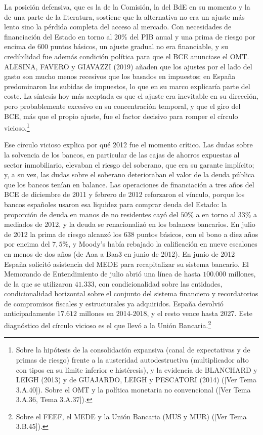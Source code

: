 \documentclass[10pt,a4paper]{article}
\newcommand{\authorfont}[1]{{\fontfamily{EBGaramond-TLF}\selectfont #1}}
\begin{document}
La posición defensiva, que es la de la Comisión, la del BdE en su momento y la de una parte de la literatura, sostiene que la alternativa no era un ajuste más lento sino la pérdida completa del acceso al mercado. Con necesidades de financiación del Estado en torno al $20\%$ del PIB anual y una prima de riesgo por encima de $600$ puntos básicos, un ajuste gradual no era financiable, y su credibilidad fue además condición política para que el BCE anunciase el OMT. ALESINA, FAVERO y GIAVAZZI (2019) añaden que los ajustes por el lado del gasto son mucho menos recesivos que los basados en impuestos; en España predominaron las subidas de impuestos, lo que en su marco explicaría parte del coste. La síntesis hoy más aceptada es que el ajuste era inevitable en su dirección, pero probablemente excesivo en su concentración temporal, y que el giro del BCE, más que el propio ajuste, fue el factor decisivo para romper el círculo vicioso.\footnote{Sobre la hipótesis de la consolidación expansiva (canal de expectativas y de primas de riesgo) frente a la austeridad autodestructiva (multiplicador alto con tipos en su límite inferior e histéresis), y la evidencia de BLANCHARD y LEIGH (2013) y de GUAJARDO, LEIGH y PESCATORI (2014) ([\authorfont{Ver Tema 3.A.40}]). Sobre el OMT y la política monetaria no convencional ([\authorfont{Ver Tema 3.A.36, Tema 3.A.37}]).
}

Ese círculo vicioso explica por qué 2012 fue el momento crítico. Las dudas sobre la solvencia de los bancos, en particular de las cajas de ahorros expuestas al sector inmobiliario, elevaban el riesgo del soberano, que era su garante implícito; y, a su vez, las dudas sobre el soberano deterioraban el valor de la deuda pública que los bancos tenían en balance. Las operaciones de financiación a tres años del BCE de diciembre de 2011 y febrero de 2012 reforzaron el vínculo, porque los bancos españoles usaron esa liquidez para comprar deuda del Estado: la proporción de deuda en manos de no residentes cayó del $50\%$ a en torno al $33\%$ a mediados de 2012, y la deuda se renacionalizó en los balances bancarios. En julio de 2012 la prima de riesgo alcanzó los $638$ puntos básicos, con el bono a diez años por encima del $7,5\%$, y Moody's había rebajado la calificación en nueve escalones en menos de dos años (de Aaa a Baa3 en junio de 2012). En junio de 2012 España solicitó asistencia del MEDE para recapitalizar su sistema bancario. El Memorando de Entendimiento de julio abrió una línea de hasta $100.000$ millones, de la que se utilizaron $41.333$, con condicionalidad sobre las entidades, condicionalidad horizontal sobre el conjunto del sistema financiero y recordatorios de compromisos fiscales y estructurales ya adquiridos. España devolvió anticipadamente $17.612$ millones en 2014-2018, y el resto vence hasta 2027. Este diagnóstico del círculo vicioso es el que llevó a la Unión Bancaria.\footnote{Sobre el FEEF, el MEDE y la Unión Bancaria (MUS y MUR) ([\authorfont{Ver Tema 3.B.45}]).
}
\end{document}
